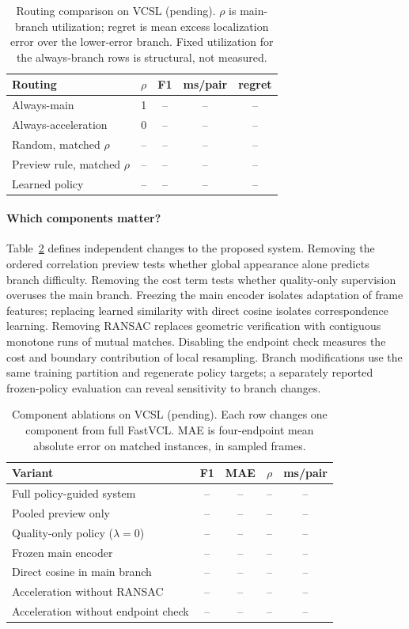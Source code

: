 \begin{table}[t]
\centering\footnotesize
\setlength{\tabcolsep}{4pt}
\caption{Routing comparison on VCSL (pending). $\rho$ is main-branch utilization; regret is
mean excess localization error over the lower-error branch. Fixed utilization for the
always-branch rows is structural, not measured.}
\label{tab:routing}
\begin{tabular}{@{}lcccc@{}}
\toprule
Routing & $\rho$ & F1 & ms/pair & regret\\
\midrule
Always-main & 1 & -- & -- & --\\
Always-acceleration & 0 & -- & -- & --\\
Random, matched $\rho$ & -- & -- & -- & --\\
Preview rule, matched $\rho$ & -- & -- & -- & --\\
Learned policy & -- & -- & -- & --\\
\bottomrule
\end{tabular}
\end{table}

\paragraph{Which components matter?}
Table~\ref{tab:ablation} defines independent changes to the proposed system. Removing the
ordered correlation preview tests whether global appearance alone predicts branch difficulty.
Removing the cost term tests whether quality-only supervision overuses the main branch.
Freezing the main encoder isolates adaptation of frame features; replacing learned similarity
with direct cosine isolates correspondence learning. Removing RANSAC replaces geometric
verification with contiguous monotone runs of mutual matches. Disabling the endpoint check
measures the cost and boundary contribution of local resampling. Branch modifications use
the same training partition and regenerate policy targets; a separately reported frozen-policy
evaluation can reveal sensitivity to branch changes.

\begin{table}[t]
\centering\footnotesize
\setlength{\tabcolsep}{3pt}
\caption{Component ablations on VCSL (pending). Each row changes one component from full
FastVCL. MAE is four-endpoint mean absolute error on matched instances, in sampled frames.}
\label{tab:ablation}
\begin{tabular}{@{}lcccc@{}}
\toprule
Variant & F1 & MAE & $\rho$ & ms/pair\\
\midrule
Full policy-guided system & -- & -- & -- & --\\
Pooled preview only & -- & -- & -- & --\\
Quality-only policy ($\lambda=0$) & -- & -- & -- & --\\
Frozen main encoder & -- & -- & -- & --\\
Direct cosine in main branch & -- & -- & -- & --\\
Acceleration without RANSAC & -- & -- & -- & --\\
Acceleration without endpoint check & -- & -- & -- & --\\
\bottomrule
\end{tabular}
\end{table}

